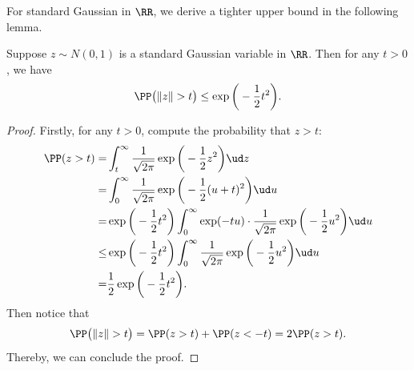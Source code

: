 For standard Gaussian in $\RR$, we derive a tighter upper bound in the following lemma.
\begin{lemma}\label{lemma:gaussian-tail}
    Suppose $z\sim N(0,1)$ is a standard Gaussian variable in $\RR$. Then for any $t>0$, we have
    \begin{equation*}
       \PP\big( \norm{z} > t \big) \leq  \exp\bigg(-\frac{1}{2}t^2\bigg).
    \end{equation*}
\end{lemma}
\begin{proof}
    Firstly, for any $t>0$, compute the probability that $z>t$:
    \begin{align*}
        \PP( z > t ) =& \int_t^\infty \frac{1}{\sqrt{2\pi}}\exp\bigg( -\frac{1}{2}z^2 \bigg) \ud z \\
        = & \int_0^\infty \frac{1}{\sqrt{2\pi}}\exp\bigg( -\frac{1}{2}(u+t)^2 \bigg) \ud u \\
        =& \exp\bigg(-\frac{1}{2}t^2 \bigg)\int_0^\infty \exp(-tu)\cdot\frac{1}{\sqrt{2\pi}}\exp\bigg( -\frac{1}{2}u^2 \bigg) \ud u \\
        \leq & \exp\bigg(-\frac{1}{2}t^2 \bigg)\int_0^\infty \frac{1}{\sqrt{2\pi}}\exp\bigg( -\frac{1}{2}u^2 \bigg) \ud u \\
        = & \frac{1}{2}\exp\bigg(-\frac{1}{2}t^2 \bigg).
    \end{align*}
    Then notice that
\begin{align*}
    \PP\big( \norm{z} > t \big) = \PP( z > t ) + \PP( z < -t ) = 2\PP( z > t ).
\end{align*}
Thereby, we can conclude the proof.
\end{proof}